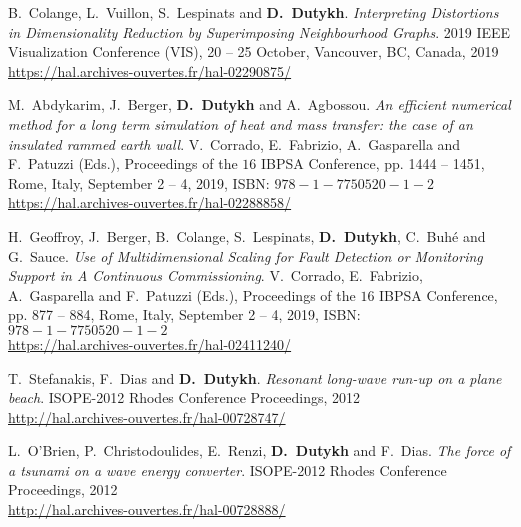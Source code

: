 \begin{etaremune}


  \item B.~Colange, L.~Vuillon, S.~Lespinats and \textbf{D.~Dutykh}. \textit{Interpreting Distortions in Dimensionality Reduction by Superimposing Neighbourhood Graphs}. 2019 IEEE Visualization Conference (VIS), 20 -- 25 October, Vancouver, BC, Canada, 2019 \\ %
  \url{https://hal.archives-ouvertes.fr/hal-02290875/}

  \item M.~Abdykarim, J.~Berger, \textbf{D.~Dutykh} and A.~Agbossou. \textit{An efficient numerical method for a long term simulation of heat and mass transfer: the case of an insulated rammed earth wall}. V.~Corrado, E.~Fabrizio, A.~Gasparella and F.~Patuzzi (Eds.), Proceedings of the $16$ IBPSA Conference, pp. 1444 -- 1451, Rome, Italy, September 2 -- 4, 2019, ISBN: $978-1-7750520-1-2$ \\ %
  \url{https://hal.archives-ouvertes.fr/hal-02288858/}

  \item H.~Geoffroy, J.~Berger, B.~Colange, S.~Lespinats, \textbf{D.~Dutykh}, C.~Buh\'e and G.~Sauce. \textit{Use of Multidimensional Scaling for Fault Detection or Monitoring Support in A Continuous Commissioning}. V.~Corrado, E.~Fabrizio, A.~Gasparella and F.~Patuzzi (Eds.), Proceedings of the $16$ IBPSA Conference, pp. 877 -- 884, Rome, Italy, September 2 -- 4, 2019, ISBN: $978-1-7750520-1-2$ \\ %
  \url{https://hal.archives-ouvertes.fr/hal-02411240/}



  \item T.~Stefanakis, F.~Dias and \textbf{D.~Dutykh}. \textit{Resonant long-wave run-up on a plane beach}. ISOPE-2012 Rhodes Conference Proceedings, 2012 \\ %
  \url{http://hal.archives-ouvertes.fr/hal-00728747/}

  \item L.~O'Brien, P.~Christodoulides, E.~Renzi, \textbf{D.~Dutykh} and F.~Dias. \textit{The force of a tsunami on a wave energy converter}. ISOPE-2012 Rhodes Conference Proceedings, 2012 \\ %
  \url{http://hal.archives-ouvertes.fr/hal-00728888/}
  

\end{etaremune}
